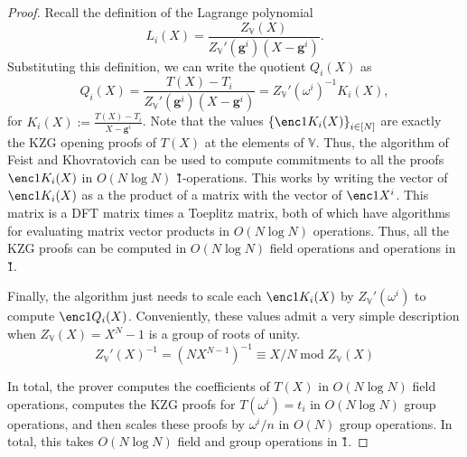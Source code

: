 \documentclass[11pt]{article} %
\newcommand{\defeq}{:=}
\newcommand{\sett}[2]{\ensuremath{\set{#1}_{#2}}\xspace}
\renewcommand{\mod}{\ensuremath{\;\mathrm{mod}\;}}
\newcommand{\set}[1]{\ensuremath{\left\{#1\right\}}\xspace}
\newcommand{\vgen}{\ensuremath{\mathbf{g}}\xspace}
\newcommand{\bigspace}{\ensuremath{\mathbb{V}}\xspace}
\newcommand{\tabsize}{\ensuremath{N}\xspace}
\newcommand{\tabruntime}{\ensuremath{\tabsize\log\tabsize}\xspace}
\begin{document}
\begin{proof} 
    Recall the definition of the Lagrange polynomial
    \[L_i(X) = \frac{Z_\bigspace(X)}{Z_\bigspace'(\vgen^i) (X - \vgen^i)}.\]
    Substituting this definition, we can write the quotient $Q_i(X)$ as 
    \[Q_i(X) = \frac{T(X) - T_i}{Z_\bigspace'(\vgen^i) (X - \vgen^i)} =
    Z_\bigspace'(\omega^i)^{-1} K_i(X), \]
for $K_i(X)\defeq \frac{T(X)-T_i}{X-\vgen^i}$.
Note that the values \sett{\enc1{K_i(X)}}{i\in [\tabsize]} are exactly the KZG opening proofs of $T(X)$ at the
elements of \bigspace.
    Thus, the algorithm of Feist and Khovratovich \cite{fastkzgproofsorig, fastkzgproofs} 
    can be used to compute commitments to all the proofs $\enc1{K_i(X)}$ 
    in $O(\tabruntime)$ \G1-operations. This works by writing the vector of
    $\enc1{K_i(X)}$ as a the product of a matrix with the vector of
    $\enc1{X^i}$. This matrix is a DFT matrix times a Toeplitz matrix, both of
    which have algorithms for evaluating matrix vector products in
    $O(\tabruntime)$ operations. Thus, all the KZG proofs can be computed in
    $O(\tabruntime)$ field operations and operations in \G1.
    
    Finally, the algorithm just needs to scale each $\enc1{K_i(X)}$ by
    $Z_{\bigspace}'(\omega^i)$ to compute $\enc1{Q_i(X)}$. Conveniently, these
    values admit a very simple description when $Z_\bigspace(X) = X^\tabsize -
    1$ is a group of roots of unity.
    \[Z_\bigspace'(X)^{-1} = (\tabsize X^{\tabsize-1})^{-1} \equiv X / \tabsize \mod Z_\bigspace(X)\] 

    In total, the prover computes the coefficients of $T(X)$ in $O(\tabruntime)$
    field operations, computes the KZG proofs for $T(\omega^i) = t_i$ in
    $O(\tabruntime)$ group operations, and then scales these proofs by $\omega^i
    / n$ in $O(\tabsize)$ group operations. In total, this takes
    $O(\tabruntime)$ field and group operations in \G1.
\end{proof}
\end{document}
